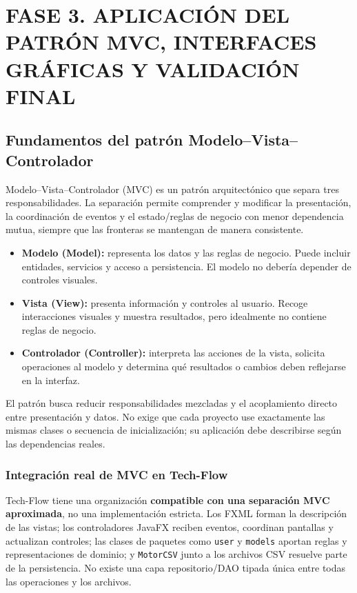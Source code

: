 \section{FASE 3. APLICACIÓN DEL PATRÓN MVC, INTERFACES GRÁFICAS Y VALIDACIÓN FINAL}

\subsection{Fundamentos del patrón Modelo--Vista--Controlador}
\label{subsec:mvc-teoria}

Modelo--Vista--Controlador (MVC) es un patrón arquitectónico que separa tres responsabilidades. La separación permite comprender y modificar la presentación, la coordinación de eventos y el estado/reglas de negocio con menor dependencia mutua, siempre que las fronteras se mantengan de manera consistente.

\begin{itemize}
    \item \textbf{Modelo (Model):} representa los datos y las reglas de negocio. Puede incluir entidades, servicios y acceso a persistencia. El modelo no debería depender de controles visuales.
    \item \textbf{Vista (View):} presenta información y controles al usuario. Recoge interacciones visuales y muestra resultados, pero idealmente no contiene reglas de negocio.
    \item \textbf{Controlador (Controller):} interpreta las acciones de la vista, solicita operaciones al modelo y determina qué resultados o cambios deben reflejarse en la interfaz.
\end{itemize}

El patrón busca reducir responsabilidades mezcladas y el acoplamiento directo entre presentación y datos. No exige que cada proyecto use exactamente las mismas clases o secuencia de inicialización; su aplicación debe describirse según las dependencias reales.

\subsubsection{Integración real de MVC en Tech-Flow}
\label{subsec:mvc-real}

Tech-Flow tiene una organización \textbf{compatible con una separación MVC aproximada}, no una implementación estricta. Los FXML forman la descripción de las vistas; los controladores JavaFX reciben eventos, coordinan pantallas y actualizan controles; las clases de paquetes como \texttt{user} y \texttt{models} aportan reglas y representaciones de dominio; y \texttt{MotorCSV} junto a los archivos CSV resuelve parte de la persistencia. No existe una capa repositorio/DAO tipada única entre todas las operaciones y los archivos.

